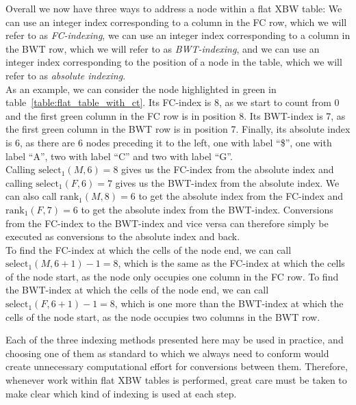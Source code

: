 \documentclass[a4paper,12pt,twoside,BCOR=10mm]{scrbook}
\begin{document}
Overall we now have three ways to address a node within a flat XBW table: 
We can use an integer index corresponding to a column in the FC row, 
which we will refer to as \textit{FC-indexing}\label{def:fc_indexing}, 
we can use an integer index corresponding to a column in the BWT row, 
which we will refer to as \textit{BWT-indexing}\label{def:bwt_indexing}, 
and we can use an integer index corresponding to the position of a node in the table, 
which we will refer to as \textit{absolute indexing}\label{def:absolute_indexing}. \\
As an example, we can consider the node highlighted in green in table~\ref{table:flat_table_with_ct}. 
Its FC-index is 8, as we start to count from 0 and the first green column in the FC row is in position 8. 
Its BWT-index is 7, as the first green column in the BWT row is in position 7. 
Finally, its absolute index is 6, as there are 6 nodes preceding it to the left, one 
with label “\$”, one with label “A”, two with label “C” and two with label “G”. \\
Calling $ \textrm{select}_1 ( M, 6 ) \boldsymbol{=} 8 $ gives us the FC-index from the absolute index and 
calling $ \textrm{select}_1 ( F, 6 ) \boldsymbol{=} 7 $ gives us the BWT-index from the absolute index. 
We can also call $ \textrm{rank}_1 ( M, 8 ) \boldsymbol{=} 6 $ to get the absolute index from the FC-index 
and $ \textrm{rank}_1 ( F, 7 ) \boldsymbol{=} 6 $ to get the absolute index from the BWT-index. 
Conversions from the FC-index to the BWT-index and vice versa can therefore simply be executed as conversions 
to the absolute index and back. \\
To find the FC-index at which the cells of the node end, 
we can call $ \textrm{select}_1 ( M, 6 + 1 ) - 1 \boldsymbol{=} 8 $, which 
is the same as the FC-index at which the cells of the node start, as the node 
only occupies one column in the FC row. 
To find the BWT-index at which the cells of the node end, 
we can call $ \textrm{select}_1 ( F, 6 + 1 ) - 1 \boldsymbol{=} 8 $, which 
is one more than the BWT-index at which the cells of the node start, 
as the node occupies two columns in the BWT row.

Each of the three indexing methods presented here 
may be used in practice, and choosing one of them as standard to which 
we always need to conform would create unnecessary computational effort for conversions 
between them. 
Therefore, whenever work within flat XBW tables is performed, great care must be taken 
to make clear which kind of indexing is used at each step.
\end{document}

